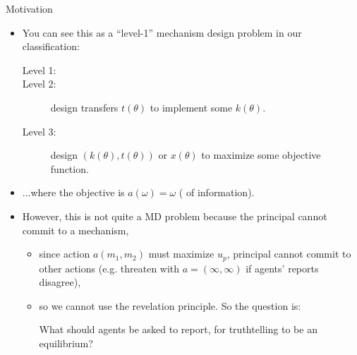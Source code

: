 \documentclass[english,10pt
,aspectratio=169
]{beamer}
\begin{document}
\begin{frame}{Motivation}
\begin{itemize}
	\item You can see this as a ``level-1'' mechanism design problem in our classification:
	{\footnotesize 
	\begin{description}
		\item[Level 1:] 
		\item[Level 2:] design transfers $t(\theta)$ to implement some $k(\theta)$.
		\item[Level 3:] design $(k(\theta),t(\theta))$ or $x(\theta)$ to maximize some objective function.
	\end{description}
	}
	\item ...where the objective is $a(\omega) = \omega$ ( of information).
	\item However, this is not quite a MD problem because the principal \alert{cannot commit} to a mechanism,
	\begin{itemize}
		\item since action $a(m_1,m_2)$ must maximize $u_p$, principal cannot commit to other actions (e.g. threaten with $a=(\infty,\infty)$ if agents' reports disagree),
		\item so we cannot use the revelation principle. So the question is:
		\begin{block}{}
			\alert{What} should agents be asked to report, for truthtelling to be an equilibrium?
		\end{block}
	\end{itemize}
\end{itemize}
\end{frame}
\end{document}
